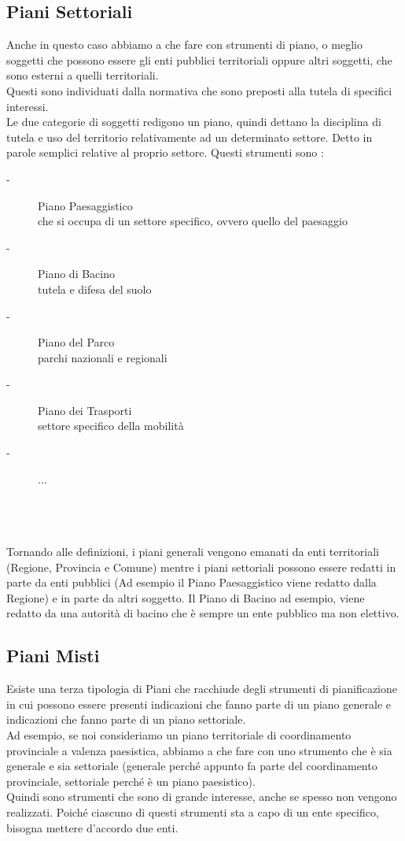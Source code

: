 \documentclass[a4paper,12pt, oneside]{book}
\begin{document}
\subsection{Piani Settoriali}
Anche in questo caso abbiamo a che fare con strumenti di piano, o meglio soggetti che possono essere gli enti pubblici territoriali oppure altri soggetti, che sono esterni a quelli territoriali.\\
Questi sono individuati dalla normativa che sono preposti alla tutela di specifici interessi.\\
Le due categorie di soggetti redigono un piano, quindi dettano la disciplina di tutela e uso del territorio relativamente ad un determinato settore. Detto in parole semplici relative al proprio settore.
Questi strumenti sono :
\begin{description}
	\item [-] Piano Paesaggistico\\
	che si occupa di un settore specifico, ovvero quello del paesaggio
	\item [-] Piano di Bacino\\
	tutela e difesa del suolo
	\item [-] Piano del Parco\\
	parchi nazionali e regionali
	\item [-] Piano dei Trasporti\\
	settore specifico della mobilità
	\item [-] ...
\end{description}
\leavevmode\\ 
\\
\\
Tornando alle definizioni, i piani generali vengono emanati da enti territoriali (Regione, Provincia e Comune) mentre i piani settoriali possono essere redatti in parte da enti pubblici (Ad esempio il Piano Paesaggistico viene redatto dalla Regione) e in parte da altri soggetto. Il Piano di Bacino ad esempio, viene redatto da una autorità di bacino che è sempre un ente pubblico ma non elettivo.\\
\subsection{Piani Misti}
Esiste una terza tipologia di Piani che racchiude degli strumenti di pianificazione in cui possono essere presenti indicazioni che fanno parte di un piano generale e indicazioni che fanno parte di un piano settoriale.\\
Ad esempio, se noi consideriamo un piano territoriale di coordinamento provinciale a valenza paesistica, abbiamo a che fare con uno strumento che è sia generale e sia settoriale (generale perché appunto fa parte del coordinamento provinciale, settoriale perché è un piano paesistico).\\
Quindi sono strumenti che sono di grande interesse, anche se spesso non vengono realizzati. Poiché ciascuno di questi strumenti sta a capo di un ente specifico, bisogna mettere d'accordo due enti.\\
\end{document}
